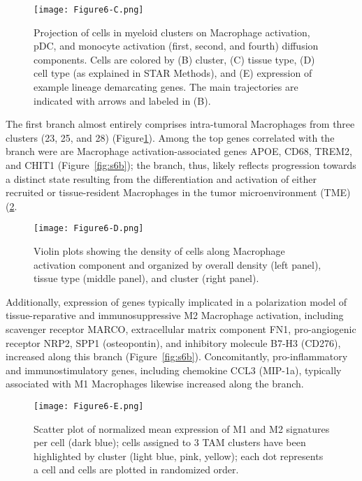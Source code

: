 \begin{figure}
\centering
\texttt{[image: Figure6-C.png]}
\caption{Projection of cells in myeloid clusters on Macrophage activation, pDC, and monocyte activation (first, second, and fourth) diffusion components.
  Cells are colored by (B) cluster, (C) tissue type, (D) cell type (as explained in STAR Methods), and (E) expression of example lineage demarcating genes.
  The main trajectories are indicated with arrows and labeled in (B).
}
\label{fig:6c}
\end{figure}

The first branch almost entirely comprises intra-tumoral Macrophages from three clusters (23, 25, and 28) (Figure\ref{fig:6c}).
Among the top genes correlated with the branch were are Macrophage activation-associated genes APOE, CD68, TREM2, and CHIT1 (Figure~\ref{fig:s6b}); the branch, thus, likely reflects progression towards a distinct state resulting from the differentiation and activation of either recruited or tissue-resident Macrophages in the tumor microenvironment (TME) (\ref{fig:6d}. 

\begin{figure}
\centering
\texttt{[image: Figure6-D.png]}
\caption{Violin plots showing the density of cells along Macrophage activation component and organized by overall density (left panel), tissue type (middle panel), and cluster (right panel).
}
\label{fig:6d}
\end{figure}

Additionally, expression of genes typically implicated in a polarization model of tissue-reparative and immunosuppressive M2 Macrophage activation, including scavenger receptor MARCO, extracellular matrix component FN1, pro-angiogenic receptor NRP2, SPP1 (osteopontin), and inhibitory molecule B7-H3 (CD276), increased along this branch (Figure~\ref{fig:s6b}).
Concomitantly, pro-inflammatory and immunostimulatory genes, including chemokine CCL3 (MIP-1a), typically associated with M1 Macrophages likewise increased along the branch.

\begin{figure}
\centering
\texttt{[image: Figure6-E.png]}
\caption{Scatter plot of normalized mean expression of M1 and M2 signatures per cell (dark blue); cells assigned to 3 TAM clusters have been highlighted by cluster (light blue, pink, yellow); each dot represents a cell and cells are plotted in randomized order.
}
\label{fig:6e}
\end{figure}


